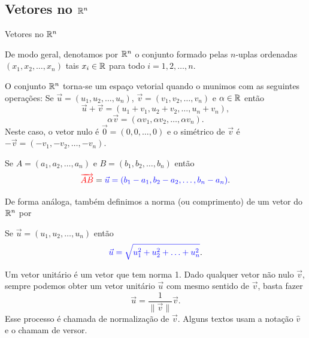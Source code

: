 \subsection*{Vetores no $\mathbb{R}^n$}
\begin{frame}[label=vetores]{Vetores no $\mathbb{R}^n$}

De modo geral, denotamos por   $\mathbb{R}^n$ o conjunto formado pelas {\color{blue} $n$-uplas ordenadas} $(x_1,x_2,\ldots,x_n)$ tais $x_i\in \mathbb{R}$ para todo $i=1,2,\ldots,n$.
\medskip

O conjunto $\mathbb{R}^n$ torna-se um espaço vetorial quando o munimos com as seguintes  operações: Se $\vec{u}=(u_1,u_2,\ldots,u_n)$,  $\vec{v}=(v_1,v_2,\ldots,v_n)$ e $\alpha\in \mathbb{R}$ então
\[\vec{u}+\vec{v}=(u_1+v_1,u_2+v_2,\ldots,u_n+v_n),\]
\[\alpha \vec{v}=(\alpha v_1,\alpha v_2,\ldots,\alpha v_n).\]
Neste caso, o {\color{blue}vetor nulo} é $\vec{0}=(0,0,\ldots,0)$ e o {\color{blue}simétrico} de $\vec{v}$ é  $-\vec{v}=(-v_1,-v_2,\ldots,-v_n)$.

\begin{center}
\begin{minipage}{0.7\textwidth}
\begin{block}{}
Se {\color{red}$A=(a_1,a_2,\ldots,a_n)$} e {\color{red}$B=(b_1,b_2,\ldots,b_n)$} então
\[{\color{red}\overrightarrow{AB}}={\color{blue}\vec{u}=(b_1-a_1,b_2-a_2,\ldots,b_n-a_n)}.\]
\end{block}
\end{minipage}
\end{center}

\end{frame}

\begin{frame}[label=vetores]
De forma análoga, também definimos a {\color{blue} norma (ou comprimento)} de um vetor do $\mathbb{R}^n$ por
\begin{center}
\begin{minipage}{0.7\textwidth}
\begin{block}{}
Se {\color{blue}$\vec{u}=(u_1,u_2,\ldots,u_n)$} então
\[{\color{blue}\vec{u}=\sqrt{u_1^2+u_2^2+\ldots+u_n^2}}.\]
\end{block}
\end{minipage}
\end{center}

Um {\color{blue} vetor unitário} é um vetor que tem norma 1. Dado qualquer vetor não nulo $\vec{v}$, sempre podemos obter um {\color{blue}vetor unitário} $\vec{u}$ com mesmo sentido de $\vec{v}$, basta fazer
\[\vec{u}=\frac{1}{\|\vec{v}\|}\vec{v}.\]
Esse processo é chamada de {\color{blue} normalização} de $\vec{v}$. Alguns textos usam a notação $\hat{v}$ e o chamam de {\color{blue}versor}.


\end{frame}

